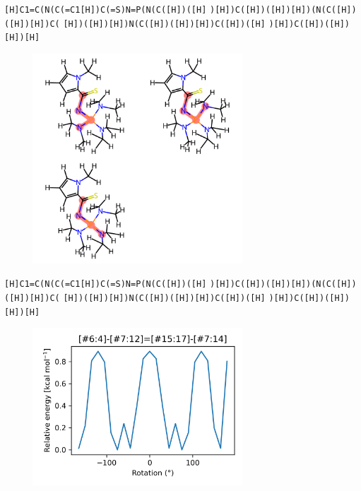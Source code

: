 \documentclass{beamer}
\begin{document}
\begin{frame}[fragile]
\verb|[H]C1=C(N(C(=C1[H])C(=S)N=P(N(C([H])([H]|
\verb|)[H])C([H])([H])[H])(N(C([H])([H])[H])C(|
\verb|[H])([H])[H])N(C([H])([H])[H])C([H])([H]|
\verb|)[H])C([H])([H])[H])[H]|

\begin{figure}
    \includegraphics[width=0.7\textwidth,height=0.7\textheight,keepaspectratio]{mol01.png}
\end{figure}
\end{frame}
\begin{frame}[fragile]
\verb|[H]C1=C(N(C(=C1[H])C(=S)N=P(N(C([H])([H]|
\verb|)[H])C([H])([H])[H])(N(C([H])([H])[H])C(|
\verb|[H])([H])[H])N(C([H])([H])[H])C([H])([H]|
\verb|)[H])C([H])([H])[H])[H]|

\begin{figure}
    \includegraphics[width=0.7\textwidth,height=0.7\textheight,keepaspectratio]{plot01.png}
\end{figure}
\end{frame}
\end{document}
